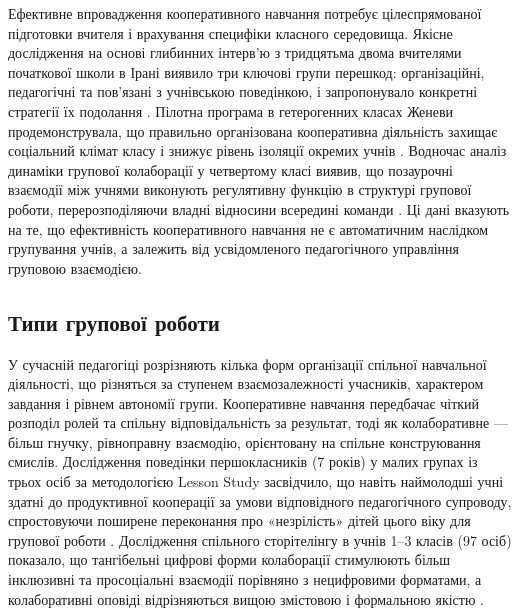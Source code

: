 \documentclass[a4paper,12pt]{article}
\begin{document}
Ефективне впровадження кооперативного навчання потребує цілеспрямованої підготовки вчителя і врахування специфіки класного середовища. Якісне дослідження на основі глибинних інтерв'ю з тридцятьма двома вчителями початкової школи в Ірані виявило три ключові групи перешкод: організаційні, педагогічні та пов'язані з учнівською поведінкою, і запропонувало конкретні стратегії їх подолання \parencite{Keramati2025120}. Пілотна програма в гетерогенних класах Женеви продемонструвала, що правильно організована кооперативна діяльність захищає соціальний клімат класу і знижує рівень ізоляції окремих учнів \parencite{Buchs202568}. Водночас аналіз динаміки групової колаборації у четвертому класі виявив, що позаурочні взаємодії між учнями виконують регулятивну функцію в структурі групової роботи, перерозподіляючи владні відносини всередині команди \parencite{Langer-Osuna2020514}. Ці дані вказують на те, що ефективність кооперативного навчання не є автоматичним наслідком групування учнів, а залежить від усвідомленого педагогічного управління груповою взаємодією.


\subsection{Типи групової роботи}

У сучасній педагогіці розрізняють кілька форм організації спільної навчальної діяльності, що різняться за ступенем взаємозалежності учасників, характером завдання і рівнем автономії групи. Кооперативне навчання передбачає чіткий розподіл ролей та спільну відповідальність за результат, тоді як колаборативне — більш гнучку, рівноправну взаємодію, орієнтовану на спільне конструювання смислів. Дослідження поведінки першокласників (7 років) у малих групах із трьох осіб за методологією Lesson Study засвідчило, що навіть наймолодші учні здатні до продуктивної кооперації за умови відповідного педагогічного супроводу, спростовуючи поширене переконання про «незрілість» дітей цього віку для групової роботи \parencite{Jakavonytė-Staškuvienė2025}. Дослідження спільного сторітелінгу в учнів 1--3 класів (97 осіб) показало, що тангібельні цифрові форми колаборації стимулюють більш інклюзивні та просоціальні взаємодії порівняно з нецифровими форматами, а колаборативні оповіді відрізняються вищою змістовою і формальною якістю \parencite{Filosofi2025801}.
\end{document}
